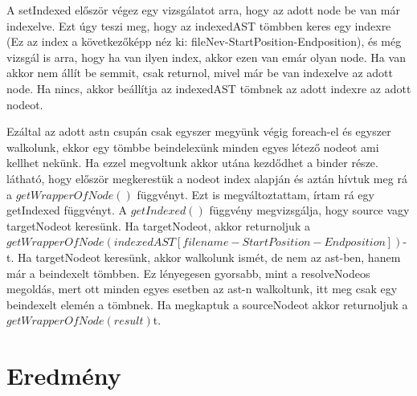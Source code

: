 A setIndexed először végez egy vizsgálatot arra, hogy az adott node be van már indexelve.
Ezt úgy teszi meg, hogy az indexedAST tömbben keres egy indexre (Ez az index a következőképp néz ki: fileNev-StartPosition-Endposition), és még vizsgál is arra, hogy ha van ilyen index, akkor ezen van emár olyan node.
Ha van akkor nem állít be semmit, csak returnol, mivel már be van indexelve az adott node. Ha nincs, akkor beállítja az indexedAST tömbnek az adott indexre az adott nodeot.

\noindent

Ezáltal az adott astn csupán csak egyszer megyünk végig foreach-el és egyszer walkolunk, ekkor egy tömbbe beindelexünk minden egyes létező nodeot ami kellhet nekünk.
Ha ezzel megvoltunk akkor utána kezdődhet a binder része.
 látható, hogy először megkerestük a nodeot index alapján és aztán hívtuk meg rá a ${getWrapperOfNode()}$ függvényt.
Ezt is megváltoztattam, írtam rá egy getIndexed függvényt.
A ${getIndexed()}$ függvény megvizsgálja, hogy source vagy targetNodeot keresünk. Ha targetNodeot, akkor returnoljuk a ${getWrapperOfNode(indexedAST[filename-StartPosition-Endposition])}$-t.
Ha targetNodeot keresünk, akkor walkolunk ismét, de nem az ast-ben, hanem már a beindexelt tömbben.
Ez lényegesen gyorsabb, mint a resolveNodeos megoldás, mert ott minden egyes esetben az ast-n walkoltunk, itt meg csak egy beindexelt elemén a tömbnek.
Ha megkaptuk a sourceNodeot akkor returnoljuk a ${getWrapperOfNode(result)}$t.
\section{Eredmény}
